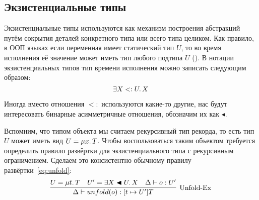 \subsection{Экзистенциальные типы} \label{subsec:existentials}

Экзистенциальные типы используются как механизм построения абстракций путём сокрытия деталей конкретного типа или всего типа целиком.
Как правило, в ООП языках если переменная имеет статический тип $U$, то во время исполнения её значение может иметь тип любого подтипа $U$ ().
В нотации экзистенциальных типов тип времени исполнения можно записать следующим образом:
\[
    \exists X <: U \ldotp X
\]

Иногда вместо отношения $<:$ используются какие-то другие, нас будут интересовать бинарные асимметричные отношения, обозначим их как $\blacktriangleleft$.

Вспомним, что типом объекта мы считаем рекурсивный тип рекорда, то есть тип $U$ может иметь вид $U = \mu x \ldotp T$.
Чтобы воспользоваться таким объектом требуется определить правило развёртки для экзистенциального типа с рекурсивным ограничением.
Сделаем это консистентно обычному правилу развёртки~\eqref{eq:unfold}:
\begin{equation}
    \label{eq:unfold-ex}
    \infer[\text{Unfold-Ex}]{
        \Delta \vdash unfold(o) : [t \mapsto U']T
    }{
        U = \mu t \ldotp T
        &
        U' = \exists X \blacktriangleleft U \ldotp X
        &
        \Delta \vdash o : U'
    }
\end{equation}
